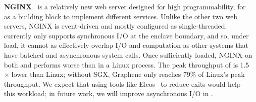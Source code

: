 

{\bf NGINX}~\cite{nginx} is a relatively new web server designed for high programmability, for as a building block to implement different services.
Unlike the other two web servers, NGINX is event-driven and mostly configured as single-threaded.
\graphenesgx{} currently only supports synchronous I/O at the enclave boundary,
and so, under load, it cannot as effectively overlap I/O and computation
as other systems that have batched and asynchronous system calls.
Once sufficiently loaded, NGINX on both \graphene{} and \graphenesgx{} 
performs worse than in a  Linux process. %
The peak throughput of \graphenesgx{} is 1.5$\times$ lower than Linux;
without SGX, Graphene only reaches 79\% of Linux's peak throughput.
We expect that using tools like Eleos~\cite{orenbach17eleos} to reduce exits
would help this workload; in future work, we will improve
asynchronous I/O in \graphenesgx{}.


